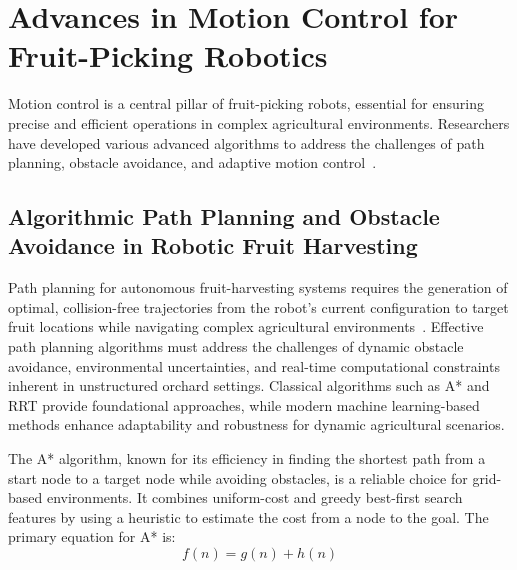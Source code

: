 \documentclass{ieeeaccess}
\begin{document}
\section{Advances in Motion Control for Fruit-Picking Robotics}
Motion control is a central pillar of fruit-picking robots, essential for ensuring precise and efficient operations in complex agricultural environments. Researchers have developed various advanced algorithms to address the challenges of path planning, obstacle avoidance, and adaptive motion control~\cite{Ahmad:2023_bnb, Loganathan:2024_hho_avoa, Teo:2020, Arrouch:2022b, 10746490}.

\subsection{Algorithmic Path Planning and Obstacle Avoidance in Robotic Fruit Harvesting}
Path planning for autonomous fruit-harvesting systems requires the generation of optimal, collision-free trajectories from the robot's current configuration to target fruit locations while navigating complex agricultural environments~\cite{Leong:2024_review}. Effective path planning algorithms must address the challenges of dynamic obstacle avoidance, environmental uncertainties, and real-time computational constraints inherent in unstructured orchard settings. Classical algorithms such as A* and RRT provide foundational approaches, while modern machine learning-based methods enhance adaptability and robustness for dynamic agricultural scenarios.

The A* algorithm, known for its efficiency in finding the shortest path from a start node to a target node while avoiding obstacles, is a reliable choice for grid-based environments. It combines uniform-cost and greedy best-first search features by using a heuristic to estimate the cost from a node to the goal. The primary equation for A* is:
\begin{equation}
f(n) = g(n) + h(n)
\label{eq:astar}
\end{equation}
\end{document}
